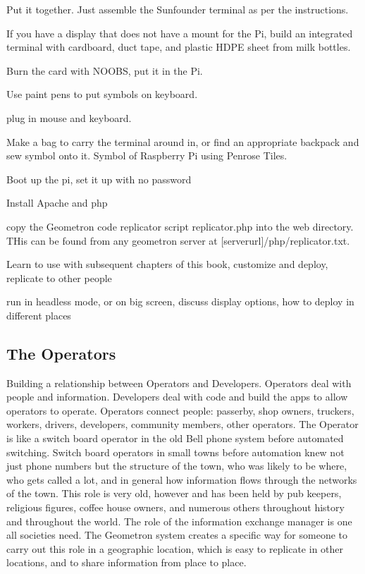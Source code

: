 Put it together.  Just assemble the Sunfounder terminal as per the instructions.  

If you have a display that does not have a mount for the Pi, build an integrated terminal with cardboard, duct tape, and plastic HDPE sheet from milk bottles.

Burn the card with NOOBS, put it in the Pi.

Use paint pens to put symbols on keyboard.

plug in mouse and keyboard.

Make a bag to carry the terminal around in, or find an appropriate backpack and sew symbol onto it.  Symbol of Raspberry Pi using Penrose Tiles.

Boot up the pi, set it up with no password

Install Apache and php

copy the Geometron code replicator script replicator.php into the web directory. THis can be found from any geometron server at [serverurl]/php/replicator.txt.  

Learn to use with subsequent chapters of this book, customize and deploy, replicate to other people

run in headless mode, or on big screen, discuss display options, how to deploy in different places


\subsection{The Operators}
Building a relationship between Operators and Developers.  Operators deal with people and information.  Developers deal with code and build the apps to allow operators to operate. Operators connect people: passerby, shop owners, truckers, workers, drivers, developers, community members, other operators.  The Operator is like a switch board operator in the old Bell phone system before automated switching.  Switch board operators in small towns before automation knew not just phone numbers but the structure of the town, who was likely to be where, who gets called a lot, and in general how information flows through the networks of the town.  This role is very old, however and has been held by pub keepers, religious figures, coffee house owners, and numerous others throughout history and throughout the world.  The role of the information exchange manager is one all societies need.  The Geometron system creates a specific way for someone to carry out this role in a geographic location, which is easy to replicate in other locations, and to share information from place to place.

